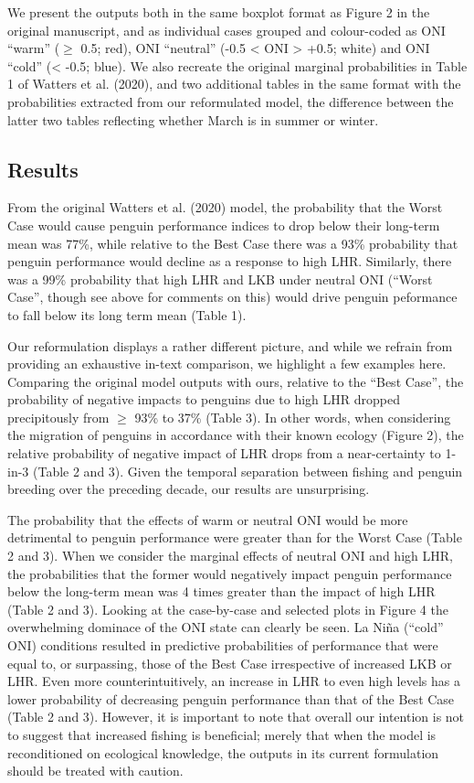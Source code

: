\documentclass[]{elsarticle} %
\begin{document}
We present the outputs both in the same boxplot format as Figure 2 in
the original manuscript, and as individual cases grouped and
colour-coded as ONI ``warm'' (\(\geqslant\) 0.5; red), ONI ``neutral''
(-0.5 \textless{} ONI \textgreater{} +0.5; white) and ONI ``cold''
(\textless{} -0.5; blue). We also recreate the original marginal
probabilities in Table 1 of Watters et al. (2020), and two additional
tables in the same format with the probabilities extracted from our
reformulated model, the difference between the latter two tables
reflecting whether March is in summer or winter.

\hypertarget{results}{%
\subsection{Results}\label{results}}

From the original Watters et al. (2020) model, the probability that the
Worst Case would cause penguin performance indices to drop below their
long-term mean was 77\%, while relative to the Best Case there was a
93\% probability that penguin performance would decline as a response to
high LHR. Similarly, there was a 99\% probability that high LHR and LKB
under neutral ONI (``Worst Case'', though see above for comments on
this) would drive penguin peformance to fall below its long term mean
(Table 1).

Our reformulation displays a rather different picture, and while we
refrain from providing an exhaustive in-text comparison, we highlight a
few examples here. Comparing the original model outputs with ours,
relative to the ``Best Case'', the probability of negative impacts to
penguins due to high LHR dropped precipitously from \(\geqslant\) 93\%
to 37\% (Table 3). In other words, when considering the migration of
penguins in accordance with their known ecology (Figure 2), the relative
probability of negative impact of LHR drops from a near-certainty to
1-in-3 (Table 2 and 3). Given the temporal separation between fishing
and penguin breeding over the preceding decade, our results are
unsurprising.

The probability that the effects of warm or neutral ONI would be more
detrimental to penguin performance were greater than for the Worst Case
(Table 2 and 3). When we consider the marginal effects of neutral ONI
and high LHR, the probabilities that the former would negatively impact
penguin performance below the long-term mean was 4 times greater than
the impact of high LHR (Table 2 and 3). Looking at the case-by-case and
selected plots in Figure 4 the overwhelming dominace of the ONI state
can clearly be seen. La Niña (``cold'' ONI) conditions resulted in
predictive probabilities of performance that were equal to, or
surpassing, those of the Best Case irrespective of increased LKB or LHR.
Even more counterintuitively, an increase in LHR to even high levels has
a lower probability of decreasing penguin performance than that of the
Best Case (Table 2 and 3). However, it is important to note that overall
our intention is not to suggest that increased fishing is beneficial;
merely that when the model is reconditioned on ecological knowledge, the
outputs in its current formulation should be treated with caution.
\end{document}
